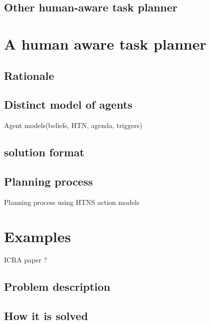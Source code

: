 \subsection{Other human-aware task planner}

\section{A human aware task planner}
\subsection{Rationale}
\subsection{Distinct model of agents}
Agent models(beliefs, HTN, agenda, triggers)
\subsection{solution format}
\subsection{Planning process}
Planning process using HTNS action models

\section{Examples}

ICRA paper ?

\subsection{Problem description}
\subsection{How it is solved}
